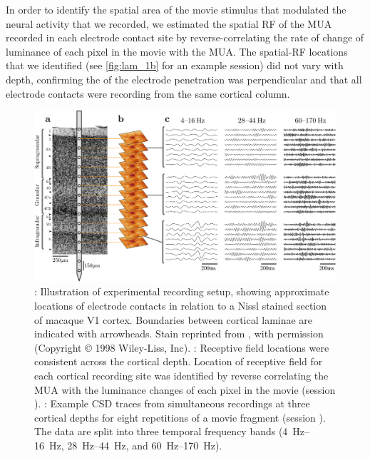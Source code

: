 In order to identify the spatial area of the movie stimulus that modulated the neural activity that we recorded, we estimated the spatial \ac{RF} of the \ac{MUA} recorded in each electrode contact site by reverse-correlating the rate of change of luminance of each pixel in the movie with the \ac{MUA}.
The spatial-\ac{RF} locations that we identified (see \autoref{fig:lam_1b} for an example session) did not vary with depth, confirming the of the electrode penetration was perpendicular and that all electrode contacts were recording from the same cortical column.


\begin{figure}[htbp]
\subfloat{\label{fig:lam_1a}}
\subfloat{\label{fig:lam_1b}}
\subfloat{\label{fig:lam_1c}}
\centering \includegraphics[width=\columnwidth]{paperfigs/fig1.pdf}
%
\caption{
\protect{}: Illustration of experimental recording setup, showing approximate locations of electrode contacts in relation to a Nissl stained section of macaque \ac{V1} cortex.
Boundaries between cortical laminae are indicated with arrowheads.
Stain reprinted from \citet{Tyler1998}, with permission (Copyright \copyright{} 1998 Wiley-Liss, Inc).
\protect{}: Receptive field locations were consistent across the cortical depth.
Location of receptive field for each cortical recording site was identified by reverse correlating the \ac{MUA} with the luminance changes of each pixel in the movie (session ).
\protect{}: Example \ac{CSD} traces from simultaneous recordings at three cortical depths for eight repetitions of a movie fragment (session ).
The data are split into three temporal frequency bands (\SIrange{4}{16}{Hz}, \SIrange{28}{44}{Hz}, and \SIrange{60}{170}{Hz}).
}%
\label{fig:lam_1}
%
\end{figure}


